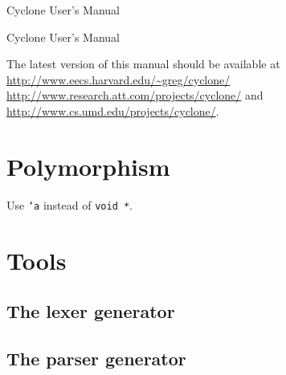 \ifscreen
\thispagestyle{empty}
\textcolor{bluegray}{
\vspace{.5in}
\begin{center}
  {\fontsize{.9in}{.8in}\selectfont Cyclone User's Manual}\\[.5in]
\end{center}
}
\else
\vspace{1in}
\begin{center}
  \Huge Cyclone User's Manual
\end{center}
\fi
\begin{center}

The latest version of this manual should be available at \\
\href{http://www.eecs.harvard.edu/~greg/cyclone/}{\url{http://www.eecs.harvard.edu/~greg/cyclone/}} \\
\href{http://www.research.att.com/projects/cyclone/}{\url{http://www.research.att.com/projects/cyclone/}} and
\href{http://www.cs.umd.edu/projects/cyclone/}{\url{http://www.cs.umd.edu/projects/cyclone/}}.
\end{center}


\newpage

\tableofcontents
\newpage

\section{Polymorphism}
\hypertarget{polymorphism}{}

Use \texttt{`a} instead of \texttt{void *}.


\appendix





\section{Tools}

\subsection{The lexer generator}
\subsection{The parser generator}



\printindex



